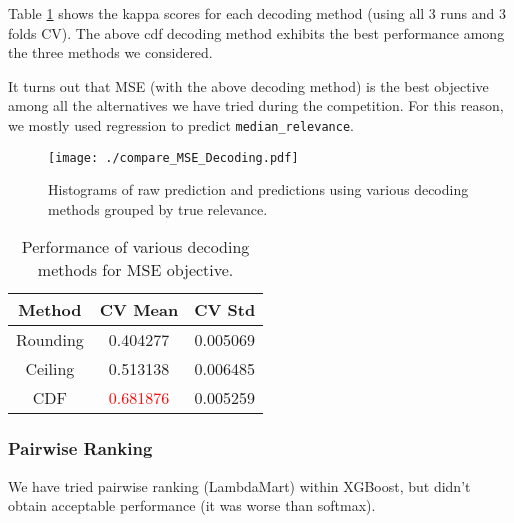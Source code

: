 \documentclass[12pt]{article}
\begin{document}
Table \ref{tab:MSE_decoding} shows the kappa scores for each decoding method (using all 3 runs and 3 folds CV). The above cdf decoding method exhibits the best performance among the three methods we considered.

It turns out that MSE (with the above decoding method) is the best objective among all the alternatives we have tried during the competition. For this reason, we mostly used regression to predict \texttt{median\_relevance}.

\begin{figure}[t]
\centering
\texttt{[image: ./compare\_MSE\_Decoding.pdf]}
\caption{Histograms of raw prediction and predictions using various decoding methods grouped by true relevance.}
\label{fig:MSE_decoding}
\end{figure}

\begin{table}[t]
\centering
\caption{Performance of various decoding methods for MSE objective.}
\label{tab:MSE_decoding}
\begin{tabular}{|c|c|c|}
\hline
Method & CV Mean & CV Std \\
\hline
Rounding & 0.404277 & 0.005069\\
\hline
Ceiling & 0.513138 & 0.006485\\
\hline
CDF & \textcolor{red}{0.681876} & 0.005259\\
\hline
\end{tabular}
\end{table}

\subsubsection{Pairwise Ranking}
We have tried pairwise ranking (LambdaMart) within XGBoost, but didn't obtain acceptable performance (it was worse than softmax).
\end{document}
